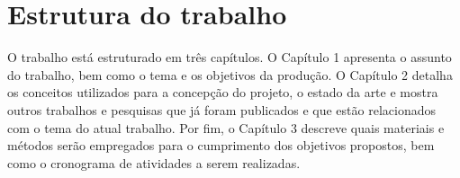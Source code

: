 \section{Estrutura do trabalho}\label{sec:estruturaTrabalho}

O trabalho está estruturado em três capítulos. O Capítulo 1 apresenta o assunto do trabalho, bem como o tema e os objetivos da produção. O Capítulo 2 detalha os conceitos utilizados para a concepção do projeto, o estado da arte e mostra outros trabalhos e pesquisas que já foram publicados e que estão relacionados com o tema do atual trabalho. Por fim, o Capítulo 3 descreve quais materiais e métodos serão empregados para o cumprimento dos objetivos propostos, bem como o cronograma de atividades a serem realizadas.